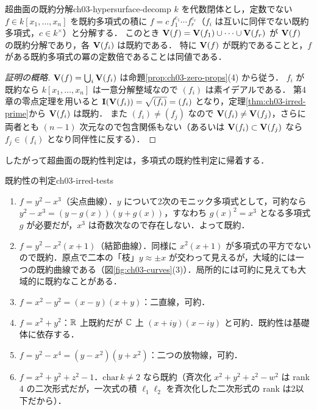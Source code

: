 \begin{myprop}{超曲面の既約分解}{ch03-hypersurface-decomp}
$k$ を代数閉体とし，定数でない $f\in k[x_1,\dots,x_n]$ を既約多項式の積に $f=c\,f_1^{e_1}\cdots f_r^{e_r}$（$f_i$ は互いに同伴でない既約多項式，$c\in k^\times$）と分解する．
このとき $\mathbf{V}(f)=\mathbf{V}(f_1)\cup\cdots\cup\mathbf{V}(f_r)$ が $\mathbf{V}(f)$ の既約分解であり，各 $\mathbf{V}(f_i)$ は既約である．
特に $\mathbf{V}(f)$ が既約であることと，$f$ がある既約多項式の冪の定数倍であることは同値である．
\end{myprop}

\begin{proof}[証明の概略]
$\mathbf{V}(f)=\bigcup_i\mathbf{V}(f_i)$ は命題\ref{prop:ch03-zero-props}(4) から従う．
$f_i$ が既約なら $k[x_1,\dots,x_n]$ は一意分解整域なので $(f_i)$ は素イデアルである．
第4章の零点定理を用いると $\mathbf{I}(\mathbf{V}(f_i))=\sqrt{(f_i)}=(f_i)$ となり，定理\ref{thm:ch03-irred-prime}から $\mathbf{V}(f_i)$ は既約．
また $(f_i)\ne(f_j)$ なので $\mathbf{V}(f_i)\ne\mathbf{V}(f_j)$，さらに両者とも $(n-1)$ 次元なので包含関係もない（あるいは $\mathbf{V}(f_i)\subset\mathbf{V}(f_j)$ なら $f_j\in(f_i)$ となり同伴性に反する）．
\end{proof}

したがって超曲面の既約性判定は，多項式の既約性判定に帰着する．

\begin{myex}{既約性の判定}{ch03-irred-tests}
\begin{enumerate}
  \item $f=y^2-x^3$（尖点曲線）．$y$ について2次のモニック多項式として，可約なら $y^2-x^3=(y-g(x))(y+g(x))$，すなわち $g(x)^2=x^3$ となる多項式 $g$ が必要だが，$x^3$ は奇数次なので存在しない．よって既約．
  \item $f=y^2-x^2(x+1)$（結節曲線）．同様に $x^2(x+1)$ が多項式の平方でないので既約．原点で二本の「枝」$y\approx\pm x$ が交わって見えるが，大域的には一つの既約曲線である（図\ref{fig:ch03-curves}(3)）．局所的には可約に見えても大域的に既約なことがある．
  \item $f=x^2-y^2=(x-y)(x+y)$：二直線，可約．
  \item $f=x^2+y^2$：$\mathbb{R}$ 上既約だが $\mathbb{C}$ 上 $(x+iy)(x-iy)$ と可約．既約性は基礎体に依存する．
  \item $f=y^2-x^4=(y-x^2)(y+x^2)$：二つの放物線，可約．
  \item $f=x^2+y^2+z^2-1$．$\mathrm{char}\,k\ne2$ なら既約（斉次化 $x^2+y^2+z^2-w^2$ は rank 4 の二次形式だが，一次式の積 $\ell_1\ell_2$ を斉次化した二次形式の rank は2以下だから）．
\end{enumerate}
\end{myex}

